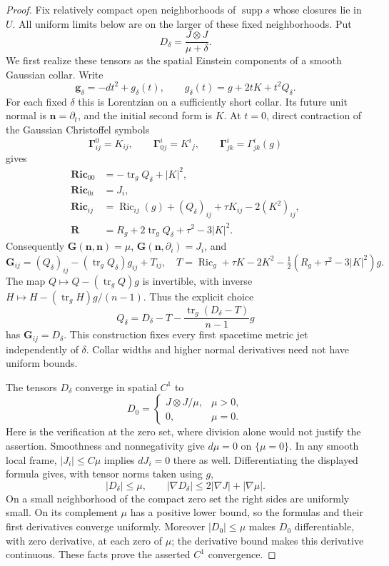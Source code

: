 \begin{proof}
Fix relatively compact open neighborhoods of $\operatorname{supp}s$
whose closures lie in $U$.  All uniform limits below are on the larger
of these fixed neighborhoods.  Put
\[
 D_\delta=\frac{J\otimes J}{\mu+\delta}.
\]
We first realize these tensors as the spatial Einstein components of a
smooth Gaussian collar.  Write
\[
 \mathbf g_\delta=-dt^2+g_\delta(t),\qquad
 g_\delta(t)=g+2tK+t^2Q_\delta.
\]
For each fixed $\delta$ this is Lorentzian on a sufficiently short
collar.  Its future unit normal is $\mathbf n=\partial_t$, and the
initial second form is $K$.  At $t=0$, direct contraction of the Gaussian
Christoffel symbols
\[
 \boldsymbol\Gamma^0_{ij}=K_{ij},\qquad
 \boldsymbol\Gamma^i_{0j}=K^i{}_j,\qquad
 \boldsymbol\Gamma^i_{jk}=\Gamma^i_{jk}(g)
\]
gives
\[
 \begin{split}
 \mathbf{Ric}_{00}&=-\operatorname{tr}_gQ_\delta+|K|^2,\\
 \mathbf{Ric}_{0i}&=J_i,\\
 \mathbf{Ric}_{ij}&=\operatorname{Ric}_{ij}(g)
              +(Q_\delta)_{ij}+\tau K_{ij}-2(K^2)_{ij},\\
 \mathbf R&=R_g+2\operatorname{tr}_gQ_\delta
                   +\tau^2-3|K|^2.
 \end{split}
\]
Consequently $\mathbf G(\mathbf n,\mathbf n)=\mu$,
$\mathbf G(\mathbf n,\partial_i)=J_i$, and
\[
 \mathbf G_{ij}=(Q_\delta)_{ij}
                  -(\operatorname{tr}_gQ_\delta)g_{ij}+T_{ij},
 \quad
 T=\operatorname{Ric}_g+\tau K-2K^2
       -\tfrac12(R_g+\tau^2-3|K|^2)g.
\]
The map $Q\mapsto Q-(\operatorname{tr}_gQ)g$ is invertible, with
inverse $H\mapsto H-(\operatorname{tr}_gH)g/(n-1)$.  Thus the explicit
choice
\[
 Q_\delta=D_\delta-T
             -\frac{\operatorname{tr}_g(D_\delta-T)}{n-1}g
\]
has $\mathbf G_{ij}=D_\delta$.  This construction fixes every first
spacetime metric jet independently of $\delta$.  Collar widths and
higher normal derivatives need not have uniform bounds.

The tensors $D_\delta$ converge in spatial $C^1$ to
\[
 D_0=\begin{cases}J\otimes J/\mu,&\mu>0,\\0,&\mu=0.
 \end{cases}
\]
Here is the verification at the zero set, where division alone would
not justify the assertion.  Smoothness and nonnegativity give
$d\mu=0$ on $\{\mu=0\}$.  In any smooth local frame,
$|J_i|\leq C\mu$ implies $dJ_i=0$ there as well.  Differentiating the
displayed formula gives, with tensor norms taken using $g$,
\[
 |D_\delta|\leq\mu,\qquad
 |\nabla D_\delta|
 \leq 2|\nabla J|+|\nabla\mu|.
\]
On a small neighborhood of the compact zero set the right sides are
uniformly small.  On its complement $\mu$ has a positive lower bound,
so the formulas and their first derivatives converge uniformly.
Moreover $|D_0|\leq\mu$ makes $D_0$ differentiable, with zero derivative,
at each zero of $\mu$; the derivative bound makes this derivative
continuous.  These facts prove the asserted $C^1$ convergence.


\end{proof}
